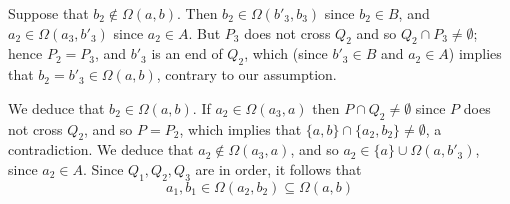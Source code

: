 Suppose that $b_2 \notin \Omega(a, b)$. Then $b_2 \in \Omega(b'_3, b_3)$ since $b_2 \in B$, and $a_2 \in \Omega(a_3, b'_3)$ since $a_2 \in A$. But $P_3$ does not cross $Q_2$ and so $Q_2 \cap P_3 \ne \emptyset$; hence $P_2 = P_3$, and $b'_3$ is an end of $Q_2$, which (since $b'_3 \in B$ and $a_2 \in A$) implies that $b_2 = b'_3 \in \Omega(a, b)$, contrary to our assumption.

We deduce that $b_2 \in \Omega(a, b)$. If $a_2 \in \Omega(a_3, a)$ then $P \cap Q_2 \ne \emptyset$ since $P$ does not cross $Q_2$, and so $P = P_2$, which implies that $\{a, b\} \cap \{a_2, b_2\} \ne \emptyset$, a contradiction. We deduce that $a_2 \notin \Omega(a_3, a)$, and so $a_2 \in \{a\} \cup \Omega(a, b'_3)$, since $a_2 \in A$. Since $Q_1, Q_2, Q_3$ are in order, it follows that
\begin{equation*}
a_1, b_1 \in \Omega(a_2, b_2) \subseteq \Omega(a, b)
\end{equation*}
